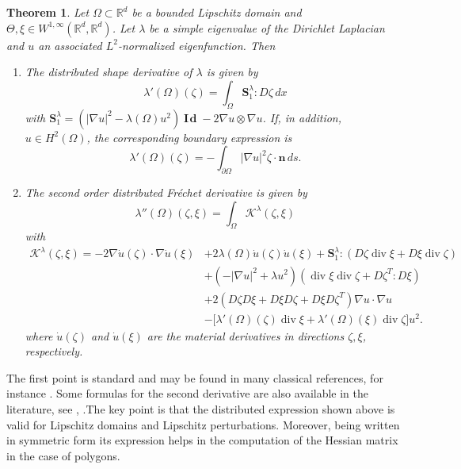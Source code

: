 \documentclass[11pt]{article}
\numberwithin{equation}{section}\newtheorem*{jepEnonce}{\jepEnonceTitle}\newenvironment{enonce*}[1]{\def\jepEnonceTitle{#1}\jepEnonce}{\endjepEnonce}\newtheorem*{conj*}{Conjecture}
\newenvironment{enumeratei}
{\bgroup\def\theenumi{\roman{enumi}}\def\theenumii{\arabic{enumii}}\begin{enumerate}}
{\end{enumerate}\egroup}
\theoremstyle{plain}
\newtheorem{thm}{Theorem}[section]
\theoremstyle{definition}
\newcommand{\di}{\operatorname{div}}
\newcommand{\bo}[1]{{\boldsymbol#1}}
\newcommand{\Id}{\operatorname{{\bo I\!\bo d}}}
\let\Bbb\mathbb
\def\R{\mathbb{R}}
\begin{document}
\begin{thm}\label{thm:sh-deriv-eig}
Let $\Omega\subset \R^d$ be a bounded Lipschitz domain and $\Theta,\xi \!\in\! W^{1,\infty}(\Bbb{R}^d,\Bbb{R}^d)$. Let $\lambda$ be a simple eigenvalue of the Dirichlet Laplacian and $u$ an associated $L^2$\nobreakdash-normalized eigenfunction. Then
\begin{enumeratei}
\item
The distributed shape derivative of $\lambda$ is given by
\[
\lambda'(\Omega)(\zeta) = \int_\Omega \bo S_1^\lambda : D\zeta \, dx
\]
with $\bo S_1^\lambda = (|\nabla u|^2 -\lambda(\Omega) u^2)\Id -2\nabla u \otimes \nabla u$. If, in addition, $u \in H^2(\Omega)$, the corresponding boundary expression is
\[
\lambda'(\Omega)(\zeta) = -\int_{\partial \Omega} |\nabla u|^2\zeta\cdot \bo n\, ds.
\]

\item
The second order distributed Fréchet derivative is given by
\[
\lambda''(\Omega)(\zeta,\xi)= \int_\Omega \mathcal K^\lambda (\zeta,\xi)
\]
with
\begin{align*}
\mathcal K^\lambda(\zeta,\xi)  = -2\nabla \dot u(\zeta)\cdot \nabla \dot u(\xi)&+2\lambda(\Omega)\dot u(\zeta) \dot u(\xi)+ \bo S_1^\lambda: (D\zeta\di \xi+D\xi \di \zeta) \\
& +\left(-|\nabla u|^2+\lambda u^2\right) (\di \xi \di \zeta+D\zeta^T:D\xi)\\
& +2 (D\zeta D\xi+D\xi D\zeta+D\xi D\zeta^T)\nabla u\cdot \nabla u\\
& -\big[\lambda'(\Omega)(\zeta)\di \xi+\lambda'(\Omega)(\xi) \di \zeta \big]u^2 .
\end{align*}
where $\dot u(\zeta)$ and $\dot u(\xi)$ are the material derivatives in directions $\zeta, \xi$, respectively.
\end{enumeratei}
\end{thm}

The first point is standard and may be found in many classical references, for instance \cite{henrot-pierre-english}. Some formulas for the second derivative are also available in the literature, see \cite{henrot-pierre-english}, \cite{HPR04}.The key point is that the distributed expression shown above is valid for Lipschitz domains and Lipschitz perturbations. Moreover, being written in symmetric form its expression helps in the computation of the Hessian matrix in the case of polygons.
\end{document}
